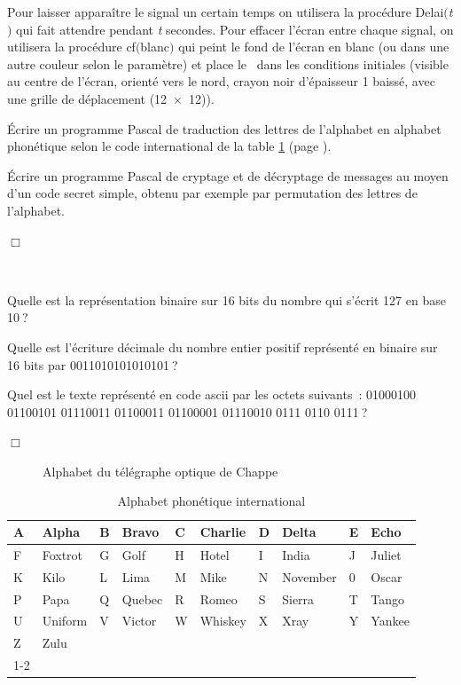 \begin{exercices}
{  Pour laisser apparaître le signal un certain temps on utilisera la pro\-cé\-du\-re 
  {\idt Delai$(${\rm\em t}$)$} qui fait attendre pendant {\rm\em t} secondes. Pour effacer l'écran
  entre chaque signal, on utilisera la procédure {\idt cf$($blanc$)$} qui peint le fond de l'écran
  en blanc (ou dans une autre couleur selon le paramètre) et place le \robot\ dans les conditions initiales
  (visible au centre de l'écran, or\-ien\-té vers le nord, crayon noir d'épaisseur 1 baissé, avec une grille 
  de déplacement (12~$\times$~12)).

  \tiret Écrire un programme Pascal de traduction des lettres de l'alphabet en alphabet phonétique
  selon le code international de la table \ref{tab:alphone} (page \pageref{tab:alphone}).

   \tiret Écrire un programme Pascal de cryptage et de décryptage de messages au moyen d'un code secret
   simple, obtenu par exemple par permutation des lettres de l'alphabet.

\noindent $\Box$}\end{exercices}
\begin{exercices}{\ \\
\vspace{-\baselineskip}

\tiret Quelle est la représentation binaire sur 16 bits du nombre qui s'écrit 127 
en base 10$\:$?

\tiret Quelle est l'écriture décimale du nombre entier positif re\-pré\-sen\-té
en binaire sur 16 bits par  0011010101010101$\:$?

\tiret Quel est le texte représenté en code {\sc ascii} par les octets suivants~:
01000100 01100101 01110011 01100011 01100001
01110010 0111 0110 0111$\:$?

\noindent $\Box$}\end{exercices}
\begin{figure}[htbp]
 \caption{Alphabet du télégraphe optique de Chappe}\label{fig:chappe}
\end{figure}
\begin{table}[htbp]
\begin{center}
\begin{tabular}{@{}|l|l||l|l||l|l||l|l||l|l|@{}} \hline
A & Alpha   & B  & Bravo & C & Charlie & D & Delta   & E  & Echo \\\hline
F & Foxtrot  & G & Golf   & H  & Hotel & I & India & J & Juliet \\\hline
K  & Kilo & L & Lima & M & Mike   & N  & November & 0 & Oscar \\\hline
P & Papa   & Q  & Quebec & R & Romeo  & S & Sierra   & T  & Tango \\\hline
U & Uniform & V & Victor   & W  & Whiskey & X & Xray & Y & Yankee   \\\hline
Z  & Zulu &   \multicolumn{8}{c}{}   \\\cline{1-2}
\end{tabular}
\end{center}
\caption{Alphabet phonétique international}\label{tab:alphone}
\end{table}
